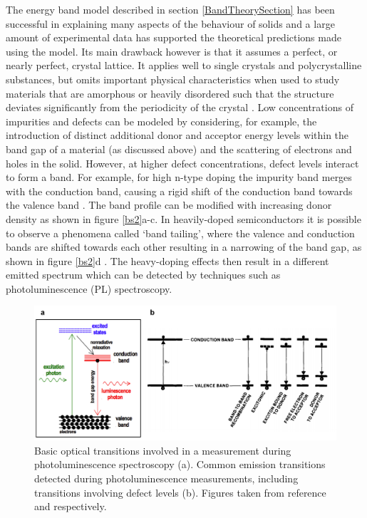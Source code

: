 \documentclass[11pt, twoside]{report}
\begin{document}
The energy band model described in section \ref{BandTheorySection} has been successful in explaining many aspects of the behaviour of solids and a large amount of experimental data has supported the theoretical predictions made using the model. Its main drawback however is that it assumes a perfect, or nearly perfect, crystal lattice. It applies well to single crystals and polycrystalline substances, but omits important physical characteristics when used to study materials that are amorphous or heavily disordered such that the structure deviates significantly from the periodicity of the crystal \cite{small_semiconductor1}.
Low concentrations of impurities and defects can be modeled by considering, for example, the introduction of distinct additional donor and acceptor energy levels within the band gap of a material (as discussed above) and the scattering of electrons and holes in the solid. 
However, at higher defect concentrations, defect levels interact to form a band. For example, for high n-type doping the impurity band merges with the conduction band, causing a rigid shift of the conduction band towards the valence band \cite{Pankove}. The band profile can be modified with increasing donor density as shown in figure \ref{bs2}a-c. 
In heavily-doped semiconductors it is possible to observe a phenomena called `band tailing', where the valence and conduction bands are shifted towards each other resulting in a narrowing of the band gap, as shown in figure \ref{bs2}d \cite{Pankove}. The heavy-doping effects then result in a different emitted spectrum which can be detected by techniques such as photoluminescence (PL) spectroscopy. 

\begin{figure}[h!]
  \centering
    \includegraphics[width=1.0\textwidth]{figures/PL_transitions.png}
    \caption[Basic optical transitions involved in a measurement during photoluminescence spectroscopy (a). Common emission transitions detected during photoluminescence measurements, including transitions involving defect levels (b).]{Basic optical transitions involved in a measurement during photoluminescence spectroscopy (a). Common emission transitions detected during photoluminescence measurements, including transitions involving defect levels (b). Figures taken from reference  and  respectively.}
  \label{PL_transitions}
\end{figure}
\end{document}
